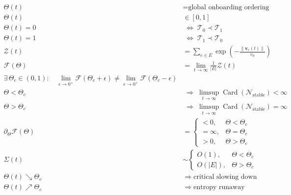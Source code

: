 \documentclass[11pt,oneside]{article}
\begin{document}
\begin{align}
\Theta(t) &= \text{global onboarding ordering parameter} \\[6pt]
\Theta(t) &\in [0,1] \\[10pt]

\Theta(t) = 0
&\;\Longleftrightarrow\;
\mathcal{T}_0 \prec \mathcal{T}_1
\\[6pt]

\Theta(t) = 1
&\;\Longleftrightarrow\;
\mathcal{T}_1 \prec \mathcal{T}_0
\\[12pt]

\mathcal{Z}(t)
&=
\sum_{e \in E}
\exp\!\left(
-\frac{\|\mathbf{v}_e(t)\|}{v_0}
\right)
\\[12pt]

\mathcal{F}(\Theta)
&=
\lim_{t \to \infty}
\frac{1}{|E|}
\mathcal{Z}(t)
\\[12pt]

\exists\, \Theta_c \in (0,1) :
\quad
\lim_{\epsilon \to 0^+}
\mathcal{F}(\Theta_c + \epsilon)
\neq
\lim_{\epsilon \to 0^+}
\mathcal{F}(\Theta_c - \epsilon)
\\[14pt]

\Theta < \Theta_c
&\;\Longrightarrow\;
\limsup_{t \to \infty}
\operatorname{Card}(\mathcal{N}_{\text{stable}})
< \infty
\\[10pt]

\Theta > \Theta_c
&\;\Longrightarrow\;
\limsup_{t \to \infty}
\operatorname{Card}(\mathcal{N}_{\text{stable}})
= \infty
\\[14pt]

\partial_\Theta \mathcal{F}(\Theta)
&=
\begin{cases}
< 0, & \Theta < \Theta_c \\[6pt]
= \infty, & \Theta = \Theta_c \\[6pt]
> 0, & \Theta > \Theta_c
\end{cases}
\\[14pt]

\Sigma(t)
&\sim
\begin{cases}
O(1), & \Theta < \Theta_c \\[6pt]
O(|E|), & \Theta > \Theta_c
\end{cases}
\\[14pt]

\Theta(t) \searrow \Theta_c
&\;\Longrightarrow\;
\text{critical slowing down}
\\[10pt]

\Theta(t) \nearrow \Theta_c
&\;\Longrightarrow\;
\text{entropy runaway}
\end{align}
\end{document}

